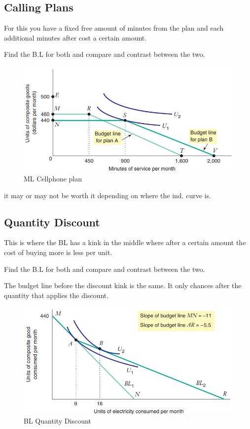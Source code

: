 \documentclass[../ECON-281-Notes.tex]{subfiles}
\begin{document}
\subsection{Calling Plans}
For this you have a fixed free amount of minutes from the plan and each additional minutes after cost a certain amount. 

Find the B.L for both and compare and contrast between the two.
\begin{figure}[htbp]
    \centering
    \includegraphics[width=0.8\columnwidth]{../assets/cellphone_plan.png}
    \caption{ML Cellphone plan}
    \label{fig:BL_cell_plan}
\end{figure}
it may or may not be worth it depending on where the ind. curve is.
\newpage
\subsection{Quantity Discount}
This is where the BL has a kink in the middle where after a certain amount the cost of buying more is less per unit. 

Find the B.L for both and compare and contrast between the two.

\begin{Note}
    The budget line before the discount kink is the same. It only chances after the quantity that applies the discount.
\end{Note}

\begin{figure}[!h]
    \centering
    \includegraphics[width=0.8\columnwidth]{../assets/quantity_discount.png}
    \caption{BL Quantity Discount}
    \label{fig:BL_quant_dis}
\end{figure}
\end{document}
